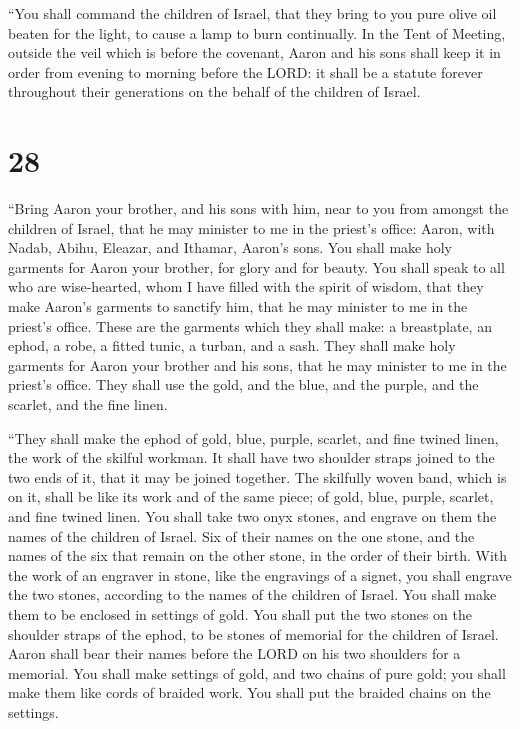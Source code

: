 ``You shall command the children of Israel, that they
bring to you pure olive oil beaten for the light, to cause a lamp to
burn continually.  In the Tent of Meeting, outside the
veil which is before the covenant, Aaron and his sons shall keep it in
order from evening to morning before the LORD: it shall be a statute
forever throughout their generations on the behalf of the children of
Israel.

\hypertarget{section-27}{%
\section{28}\label{section-27}}

 ``Bring Aaron your brother, and his sons with him, near
to you from amongst the children of Israel, that he may minister to me
in the priest's office: Aaron, with Nadab, Abihu, Eleazar, and Ithamar,
Aaron's sons.  You shall make holy garments for Aaron your
brother, for glory and for beauty.  You shall speak to all
who are wise-hearted, whom I have filled with the spirit of wisdom, that
they make Aaron's garments to sanctify him, that he may minister to me
in the priest's office.  These are the garments which they
shall make: a breastplate, an ephod, a robe, a fitted tunic, a turban,
and a sash. They shall make holy garments for Aaron your brother and his
sons, that he may minister to me in the priest's office. 
They shall use the gold, and the blue, and the purple, and the scarlet,
and the fine linen.

 ``They shall make the ephod of gold, blue, purple,
scarlet, and fine twined linen, the work of the skilful workman.
 It shall have two shoulder straps joined to the two ends
of it, that it may be joined together.  The skilfully
woven band, which is on it, shall be like its work and of the same
piece; of gold, blue, purple, scarlet, and fine twined linen.
 You shall take two onyx stones, and engrave on them the
names of the children of Israel.  Six of their names on
the one stone, and the names of the six that remain on the other stone,
in the order of their birth.  With the work of an
engraver in stone, like the engravings of a signet, you shall engrave
the two stones, according to the names of the children of Israel. You
shall make them to be enclosed in settings of gold.  You
shall put the two stones on the shoulder straps of the ephod, to be
stones of memorial for the children of Israel. Aaron shall bear their
names before the LORD on his two shoulders for a memorial.
 You shall make settings of gold,  and two
chains of pure gold; you shall make them like cords of braided work. You
shall put the braided chains on the settings.

